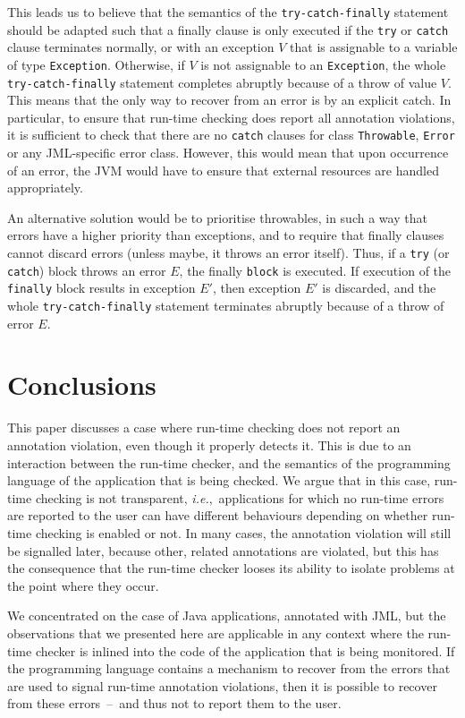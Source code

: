 \documentclass[]{llncs}
\begin{document}
This leads us to believe that the semantics of the
\texttt{try-catch-finally} statement should be adapted such that a
finally clause is only executed if the \texttt{try} or \texttt{catch}
clause terminates normally, or with an exception \(V\) that is
assignable to a variable of type \texttt{Exception}. Otherwise, if
\(V\) is not assignable to an \texttt{Exception}, the
whole \texttt{try-catch-finally} statement completes abruptly because
of a throw of value \(V\). This means that the only way to recover
from an error is by an explicit catch. In particular, to
ensure that run-time checking does report all annotation violations,
it is sufficient to check that there are no \texttt{catch} clauses for
class \texttt{Throwable}, \texttt{Error} or any JML-specific error
class. However, this would mean that upon occurrence of an error, the
JVM would have to ensure that external resources are handled
appropriately. 

An alternative solution would be to prioritise throwables, in such a
way that errors have a higher priority than exceptions, and to require
that finally clauses cannot discard errors (unless maybe, it throws an
error itself). Thus, if a \texttt{try} (or \texttt{catch}) block
throws an error \(E\), the finally \texttt{block} is executed. If
execution of the \texttt{finally} block results in exception \(E'\),
then exception \(E'\) is discarded, and the whole
\texttt{try-catch-finally} statement terminates abruptly because of a
throw of error \(E\).



\section{Conclusions}\label{SecConcl}
This paper discusses a case where run-time checking does not report an
annotation violation, even though it properly detects it. This is due
to an interaction between the run-time checker, and the semantics of
the programming language of the application that is being checked. We
argue that in this case, run-time checking is not transparent,
\emph{i.e.},\ applications for which no run-time errors are reported
to the user can have different behaviours depending on whether
run-time checking is enabled or not. In many cases, the annotation
violation will still be signalled later, because other, related
annotations are violated, but this has the consequence that the
run-time checker looses its ability to isolate problems at the point
where they occur.

We concentrated on the case of Java applications, annotated with JML,
but the observations that we presented here are applicable in any
context where the run-time checker is inlined into the code of the
application that is being monitored. If the programming language
contains a mechanism to recover from the errors that are used to
signal run-time annotation violations, then it is possible to recover
from these errors~--~and thus not to report them to the user.
\end{document}
